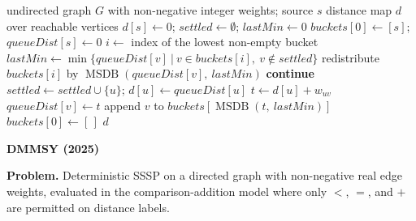 \documentclass[12pt]{article}
\begin{document}
\begin{algorithm}[H]
\small
\singlespacing
\caption{Thorup (MSDB bucket queue, simplified)}
\begin{algorithmic}[1]
\Require undirected graph $G$ with non-negative integer weights; source $s$
\Ensure distance map $d$ over reachable vertices
\State $d[s] \gets 0$; $\mathit{settled} \gets \emptyset$; $\mathit{lastMin} \gets 0$
\State $\mathit{buckets}[0] \gets [s]$; $\mathit{queueDist}[s] \gets 0$ 
  \State $i \gets$ index of the lowest non-empty bucket
    \State $\mathit{lastMin} \gets \min\{\mathit{queueDist}[v]\ |\ v \in \mathit{buckets}[i],\ v \notin \mathit{settled}\}$
    \State redistribute $\mathit{buckets}[i]$ by $\operatorname{MSDB}(\mathit{queueDist}[v],\ \mathit{lastMin})$
  \Else
       \State \textbf{continue} \EndIf
      \State $\mathit{settled} \gets \mathit{settled} \cup \{u\}$; $d[u] \gets \mathit{queueDist}[u]$
          \State $t \gets d[u] + w_{uv}$
            \State $\mathit{queueDist}[v] \gets t$
            \State append $v$ to $\mathit{buckets}[\operatorname{MSDB}(t,\ \mathit{lastMin})]$ 
          \EndIf
        \EndIf
      \EndFor
    \EndFor
    \State $\mathit{buckets}[0] \gets [\,]$
  \EndIf
\EndWhile
\State \Return $d$
\end{algorithmic}
\end{algorithm}

\newpage
\noindent\textbf{DMMSY (2025)}\label{sec:algo-dmmsy}
\medskip

\textbf{Problem.} Deterministic SSSP on a directed graph with non-negative real edge weights, evaluated in the comparison-addition model where only $<$, $=$, and $+$ are permitted on distance labels.
\medskip
\end{document}
